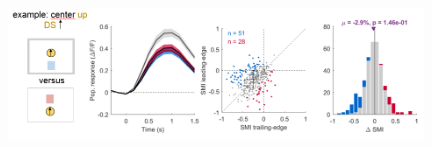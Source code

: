 \begin{figure}[H] \centering \includegraphics[width=11cm,height=11cm,keepaspectratio]{Figures/7.Results/finalPopulation/sel/diagrams/24.png} 
\end{figure}